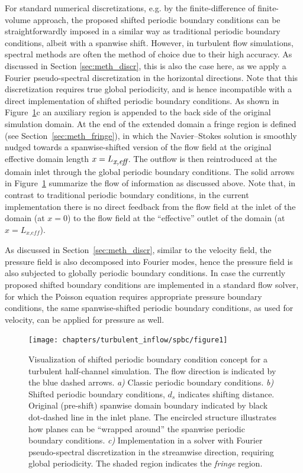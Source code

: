 	For standard numerical discretizations, e.g. by the finite-difference of finite-volume approach, the proposed shifted periodic boundary
	conditions can be straightforwardly imposed in a similar way as traditional periodic boundary conditions, albeit with a spanwise shift.
	However, in turbulent flow simulations,  spectral methods are often the method of choice due to their high accuracy. As discussed in Section
	\ref{sec:meth_discr}, this is also the case here, as we apply a Fourier pseudo-spectral discretization in the horizontal directions. Note that
	this discretization requires true global periodicity, and is hence incompatible with a direct implementation of shifted periodic boundary
	conditions. As shown in Figure~\ref{fig:concept}c an auxiliary region is appended to the back side of the original simulation domain. At the
	end of the extended domain a fringe region is defined (see Section~\ref{sec:meth_fringe}), in which the Navier--Stokes solution is smoothly
	nudged towards a spanwise-shifted version of the flow field at the original effective domain length $x = L_{\textit{\small x,eff}}$. The
	outflow is then reintroduced at the domain inlet through the global periodic boundary conditions. The solid arrows in Figure~\ref{fig:concept}
	summarize the flow of information as discussed above. Note that, in contrast to traditional periodic boundary conditions, in the current
	implementation there is no direct feedback from the flow field at the inlet of the domain (at $x=0$) to the flow field at the ``effective'' outlet of the domain (at $x=L_{\textit{x,eff}}$). 
	
	As discussed in Section~\ref{sec:meth_discr}, similar to the velocity field, the pressure field is also decomposed into Fourier modes, hence the pressure field is also subjected to globally periodic boundary conditions. In case the currently proposed shifted boundary conditions are implemented in a standard flow solver, for which the Poisson equation requires appropriate pressure boundary conditions, the same spanwise-shifted periodic boundary conditions, as used for velocity, can be applied for pressure as well.
	
	\begin{figure}
		\centering
		\texttt{[image: chapters/turbulent\_inflow/spbc/figure1]}
		\caption[Visualization of shifted periodic boundary condition concept for a turbulent half-channel simulation.]{Visualization of shifted periodic boundary condition concept for a turbulent half-channel simulation. The flow direction is indicated by the blue dashed arrows. \emph{a)} Classic periodic boundary conditions. \emph{b)} Shifted periodic boundary conditions, $d_s$ indicates shifting distance. Original (pre-shift) spanwise domain boundary indicated by black dot-dashed line in the inlet plane. The encircled structure illustrates how planes can be ``wrapped around'' the spanwise periodic boundary conditions. \emph{c)} Implementation in a solver with Fourier pseudo-spectral discretization in the streamwise direction, requiring global periodicity. The shaded region indicates the \emph{fringe} region.}
		\label{fig:concept}
	\end{figure}
	
